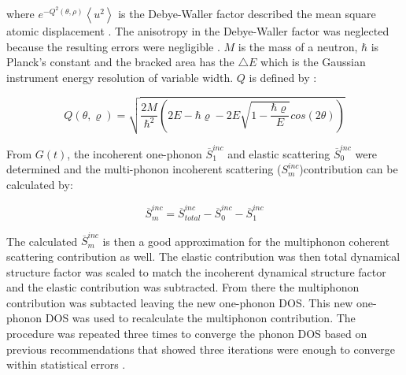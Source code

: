 \noindent where $e^{-Q^{2}\left(\theta,\rho \right) }\left< u^{2} \right>$ is the Debye-Waller factor described the mean square atomic displacement \cite{Squires2012}. The anisotropy in the Debye-Waller factor was neglected because the resulting errors were negligible \cite{Manley2001}.  $M$ is the mass of a neutron, $\hbar$ is Planck's constant and the bracked area has the $\bigtriangleup E$ which is the Gaussian instrument energy resolution of variable width. $Q$ is defined by \cite{Manley2001}:

\begin{equation}
\label{eq: Q}
Q(\theta, \varrho) = \sqrt{\frac{2M}{\hbar^{2}} \left( 2E - \hbar \varrho - 2E \sqrt{1-\frac{\hbar \varrho}{E}}cos(2\theta) \right)}
\end{equation}

\noindent From $G(t)$, the incoherent one-phonon $\overline{S}_{1}^{inc}$ and elastic scattering $\overline{S}_{0}^{inc}$ were determined and the multi-phonon incoherent scattering ($S_{m}^{inc}$)contribution can be calculated by:

\begin{equation}
\label{eq: S_inco}
\overline{S}_{m}^{inc} = \overline{S}_{total}^{inc}-\overline{S}_{0}^{inc}-\overline{S}_{1}^{inc}
\end{equation}

\noindent The calculated $\overline{S}_{m}^{inc}$ is then a good approximation for the multiphonon coherent scattering contribution as well. The elastic contribution was then total dynamical structure factor was scaled to match the incoherent dynamical structure factor and the elastic contribution was subtracted. From there the multiphonon contribution was subtacted leaving the new one-phonon DOS. This new one-phonon DOS was used to recalculate the multiphonon contribution. The procedure was repeated three times to converge the phonon DOS based on previous recommendations that showed three iterations were enough to converge within statistical errors \cite{Manley2001}.